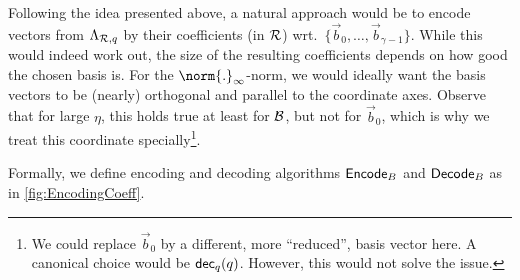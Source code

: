Following the idea presented above, a natural approach would be to encode vectors from $\Lambda_{\mathcal{R},q}$ by their coefficients (in $\mathcal{R}$) wrt.\ $\{\vec{b}_0,\ldots,\vec{b}_{\gamma-1}\}$.
While this would indeed work out, the size of the resulting coefficients depends on how good the chosen basis is.
For the $\norm{.}_\infty$-norm, we would ideally want the basis vectors to be (nearly) orthogonal and parallel to the coordinate axes.
Observe that for large $\eta$, this holds true at least for $\mathcal{B}$, but not for $\vec{b}_0$, which is why we treat this coordinate specially\footnote{We could replace $\vec{b}_0$ by a different, more ``reduced'', basis vector here. A canonical choice would be $\mathsf{dec}_q(q)$. However, this would not solve the issue.}.

Formally, we define encoding and decoding algorithms $\mathsf{Encode}_B$ and $\mathsf{Decode}_B$ as in \autoref{fig:EncodingCoeff}.




